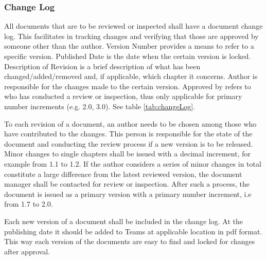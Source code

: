 \documentclass{article}
\begin{document}
	\subsubsection{Change Log}
	All documents that are to be reviewed or inspected shall have a document change log. This facilitates in tracking changes and verifying that those are approved by someone other than the author. Version Number provides a means to refer to a specific version. Published Date is the date when the certain version is locked. Description of Revision is a brief description of what has been changed/added/removed and, if applicable, which chapter it concerns. Author is responsible for the changes made to the certain version. Approved by refers to who has conducted a review or inspection, thus only applicable for primary number increments (e.g. 2.0, 3.0). See table \ref{tab:changeLog}.
	
	\begin{table}[h]
		\noindent{}
		\caption{Example of Change Log}
		\label{tab:changeLog}
	\end{table}
	
	To each revision of a document, an author needs to be chosen among those who have contributed to the changes. This person is responsible for the state of the document and conducting the review process if a new version is to be released. Minor changes to single chapters shall be issued with a decimal increment, for example from 1.1 to 1.2. If the author considers a series of minor changes in total constitute a large difference from the latest reviewed version, the document manager shall be contacted for review or inspection. After such a process, the document is issued as a primary version with a primary number increment, i.e from 1.7 to 2.0.  
	
	Each new version of a document shall be included in the change log. At the publishing date it should be added to Teams at applicable location in pdf format. This way each version of the documents are easy to find and locked for changes after approval.
	
\end{document}
